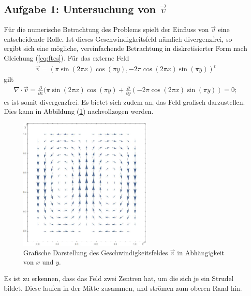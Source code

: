 \documentclass[12pt,a4paper,titlepage,headinclude,bibtotoc]{scrartcl}
\begin{document}
\subsection{Aufgabe 1: Untersuchung von $\vec{v}$}
\label{sec:task1}
Für die numerische Betrachtung des Problems spielt der Einfluss von $\vec{v}$ eine entscheidende Rolle. Ist dieses Geschwindigkeitsfeld nämlich divergenzfrei, so ergibt sich eine mögliche, vereinfachende Betrachtung in diskretisierter Form nach Gleichung (\ref{eq:ftcs}). Für das externe Feld
\begin{align*}
\vec{v} = (\pi \sin(2\pi x) \cos(\pi y), -2 \pi \cos(2\pi x) \sin(\pi y))^t
\end{align*}
gilt
\begin{align*}
\nabla \cdot \vec{v} = \frac{\partial}{\partial x} (\pi \sin(2\pi x) \cos(\pi y) + \frac{\partial}{\partial y} (-2 \pi \cos(2\pi x) \sin(\pi y)) = 0;
\end{align*}
es ist somit divergenzfrei. Es bietet sich zudem an, das Feld grafisch darzustellen. Dies kann in Abbildung (\ref{fig:task1}) nachvollzogen werden.
\begin{figure}[H]
 \centering
   \includegraphics[width=0.6\textwidth]{res/task1.png}
   \caption{Grafische Darstellung des Geschwindigkeitsfeldes $\vec{v}$ in Abhängigkeit von $x$ und $y$.}
 \label{fig:task1}
\end{figure}
Es ist zu erkennen, dass das Feld zwei Zentren hat, um die sich je ein Strudel bildet. Diese laufen in der Mitte zusammen, und strömen zum oberen Rand hin.
\end{document}

